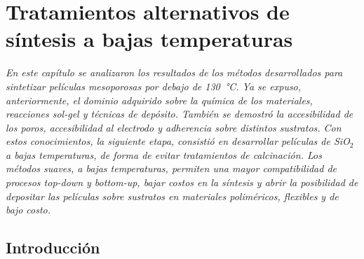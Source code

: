  \newcommand{\NoBiblioBT}[1]{
 \ifthenelse{\equal{#1}{verdadero}}{}{}
 \NoBiblioBT{verdadero}}
 

 \FormatoCapituloDosLineas
 
 \chapter{Tratamientos alternativos de síntesis a bajas temperaturas}
 \label{chap:Optimizacion}

 \thispagestyle{empty}
	
 \noindent\textit{En este capítulo se analizaron los resultados de los métodos desarrollados para sintetizar películas mesoporosas por debajo de \SI{130}{\celsius}. Ya se expuso, anteriormente, el dominio adquirido sobre la química de los materiales, reacciones sol-gel y técnicas de depósito. También se demostró la accesibilidad de los poros, accesibilidad al electrodo y adherencia sobre distintos sustratos. Con estos conocimientos, la siguiente etapa, consistió en desarrollar películas de SiO$_2$ a bajas temperaturas, de forma de evitar tratamientos de calcinación. Los métodos suaves, a bajas temperaturas, permiten una mayor compatibilidad de procesos\textit{ top-down} y\textit{ bottom-up}, bajar costos en la síntesis y abrir la posibilidad de depositar las películas sobre sustratos en materiales poliméricos, flexibles y de bajo costo.}\label{reemplazo1}
 
 \vfill
 \minitoc
 \newpage

\section{Introducción}


